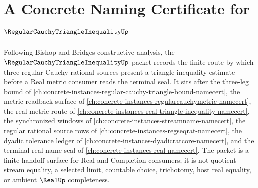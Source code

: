 \chapter{A Concrete Naming Certificate for $\RegularCauchyTriangleInequalityUp$}
\label{ch:concrete-instances-regular-cauchy-triangle-inequality-namecert}

Following Bishop and Bridges constructive analysis, the $\RegularCauchyTriangleInequalityUp$ packet records the finite route by which three regular Cauchy rational sources present a triangle-inequality estimate before a Real metric consumer reads the terminal seal. It sits after the three-leg bound of \autoref{ch:concrete-instances-regular-cauchy-triangle-bound-namecert}, the metric readback surface of \autoref{ch:concrete-instances-regularcauchymetric-namecert}, the real metric route of \autoref{ch:concrete-instances-real-triangle-inequality-namecert}, the synchronized windows of \autoref{ch:concrete-instances-streamname-namecert}, the regular rational source rows of \autoref{ch:concrete-instances-regseqrat-namecert}, the dyadic tolerance ledger of \autoref{ch:concrete-instances-dyadicratcore-namecert}, and the terminal real-name seal of \autoref{ch:concrete-instances-real-namecert}. The packet is a finite handoff surface for Real and Completion consumers; it is not quotient stream equality, a selected limit, countable choice, trichotomy, host real equality, or ambient $\RealUp$ completeness.

